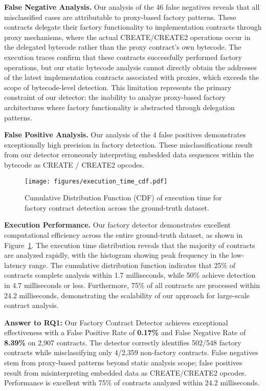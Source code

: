 \documentclass[acmsmall, screen]{acmart}
\begin{document}
	\textbf{False Negative Analysis.} Our analysis of the 46 false negatives reveals that all
	misclassified cases are attributable to proxy-based factory patterns. These contracts delegate their
	factory functionality to implementation contracts through proxy mechanisms, where the actual
	CREATE/CREATE2 operations occur in the delegated bytecode rather than the proxy contract's own
	bytecode. The execution traces confirm that these contracts successfully performed factory operations,
	but our static bytecode analysis cannot directly obtain the addresses of the latest
	implementation contracts associated with proxies, which exceeds the scope of bytecode-level detection.
	This limitation represents the primary constraint of our detector: the inability to analyze proxy-based
	factory architectures where factory functionality is abstracted through delegation patterns.

	\textbf{False Positive Analysis.} Our analysis of the 4 false positives demonstrates
	exceptionally high precision in factory detection. These misclassifications result from our detector
	erroneously interpreting embedded data sequences within the bytecode as CREATE / CREATE2 opcodes.

	\begin{figure}[htbp]
		\centering
		\texttt{[image: figures/execution\_time\_cdf.pdf]}
		\caption{Cumulative Distribution Function (CDF) of execution time for factory contract
		detection across the ground-truth dataset.}
		\label{fig:execution_time_cdf}
	\end{figure}

	\textbf{Execution Performance.} Our factory detector demonstrates excellent computational efficiency
	across the entire ground-truth dataset, as shown in Figure~\ref{fig:execution_time_cdf}. The execution
	time distribution reveals that the majority of contracts are analyzed rapidly, with the
	histogram showing peak frequency in the low-latency range. The cumulative distribution function indicates
	that 25\% of contracts complete analysis within 1.7 milliseconds, while 50\% achieve detection
	in 4.7 milliseconds or less. Furthermore, 75\% of all contracts are processed within 24.2 milliseconds,
	demonstrating the scalability of our approach for large-scale contract analysis.

	\begin{answerbox}
		\textbf{Answer to RQ1:} Our Factory Contract Detector achieves exceptional effectiveness
		with a False Positive Rate of \textbf{0.17\%} and False Negative Rate of \textbf{8.39\%} on
		2,907 contracts. The detector correctly identifies 502/548 factory contracts while misclassifying
		only 4/2,359 non-factory contracts. False negatives stem from proxy-based patterns beyond
		static analysis scope; false positives result from misinterpreting embedded data as CREATE/CREATE2
		opcodes. Performance is excellent with 75\% of contracts analyzed within 24.2 milliseconds.
	\end{answerbox}
\end{document}
